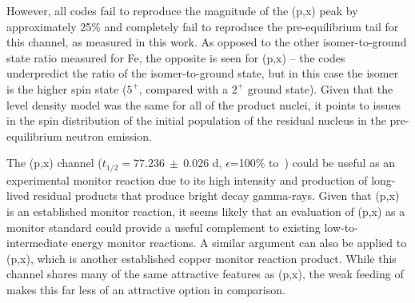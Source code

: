 However, all codes fail to reproduce the magnitude of the (p,x) peak by approximately 25\% and completely fail to reproduce the pre-equilibrium tail for this channel, as measured in this work. 
As opposed to the other isomer-to-ground state ratio measured for Fe,  the opposite is seen for (p,x) -- the codes underpredict the ratio of the isomer-to-ground state, but in this case the isomer is the higher spin state ($5^+$, compared with a  $2^+$ ground state).
Given that the level density model was the same for all of the product nuclei, it points to issues in  the spin distribution of the initial population of the residual nucleus 
in the pre-equilibrium neutron emission.








The (p,x) channel ($t_{1/2}=77.236~\pm~0.026$ d, $\epsilon$=100\% to \,\cite{Junde2011})
could be useful as an experimental monitor reaction  due to its high intensity and production of long-lived residual products that produce bright decay gamma-rays. 
Given that (p,x) is an established monitor reaction, it seems likely that an evaluation of (p,x) as a monitor standard could provide a useful complement to existing low-to-intermediate energy monitor reactions.
A similar argument can also be applied to (p,x), which is another established copper monitor reaction product.
While this channel shares many of the same attractive features as (p,x), the weak feeding of  makes this far less of an attractive option in comparison.






